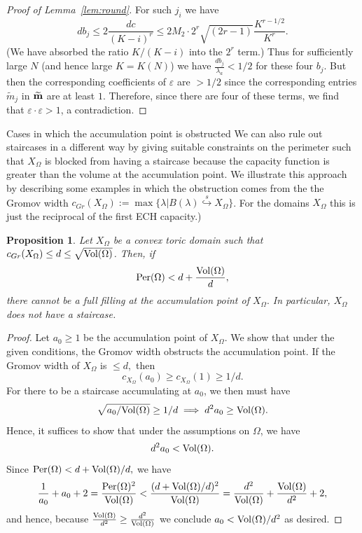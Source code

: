 \documentclass[11pt, reqno]{amsart}
\makeatletter
\def\subsection{\@startsection{subsection}{2}%
  \z@{.75\linespacing\@plus.7\linespacing}{-.5em}%
  {\normalfont\large\bfseries}}
\newtheorem{prop}[thm]{Proposition}
\theoremstyle{remark}
\numberwithin{equation}{subsection}
\numberwithin{figure}{section}
\theoremstyle{customremark}
\newcommand{\se}{{\stackrel{s}\hookrightarrow}}
\newcommand{\Vol}{{\rm Vol}}
\newcommand{\Per}{{\rm Per}}
\newcommand{\Tm}{{\widetilde m}}
\newcommand{\Om}{{\Omega}}
\newcommand{\la}{{\lambda}}
\newcommand{\eps}{\varepsilon}
\makeatother
\begin{document}
\begin{proof}[Proof of Lemma~\ref{lem:round}]
For such $j_i$ we have
$$
d b_j \le 2 \frac {dc}{ (K-i)^r}  \le 2M_2 \cdot 2^{r} \sqrt{ (2r-1) } \frac{ K^{r-1/2}}{K^r}.
$$
(We have absorbed the ratio $K/(K-i)$  into the $2^r$ term.)  Thus for sufficiently large $N$ (and hence large  $K=K(N)$) we have $\frac{d b_{j}}{\lambda_a} < 1/2$ for these four $b_j$.
But then the corresponding coefficients of $\eps$ are $> 1/2$ since the corresponding entries $\Tm_j$ in $\widetilde{\bf m}$ are at least $1$. Therefore, since there are four of these terms, we find that $\eps\cdot\eps> 1$, a contradiction.
\end{proof}






\subsection{Cases in which the accumulation point is obstructed}\label{ss:accobstr}
We can also rule out staircases in a different way by giving suitable constraints on the perimeter such that $X_\Omega$ is blocked from having a staircase because  the capacity function is greater than the volume at the accumulation point.  We  illustrate this
approach by describing some examples in which the obstruction comes from the the Gromov width $c_{Gr}(X_\Omega):= \max\{ \la | B(\la)\se X_\Om\}$. For the domains $X_\Om$ this is just
 the reciprocal of
 the first ECH capacity.) 
 
\begin{prop} \label{prop:noStairGromov}
     Let $X_\Omega$ be a convex toric domain such that $c_{Gr}(X_\Omega) \leq d \le \sqrt{\Vol(\Om)}$.
     Then, if 
     \begin{equation} 
     \label{eq:PVbound} \Per(\Omega)<d+\frac{\Vol(\Omega)}{d},
     \end{equation} 
     there cannot be a full filling at the accumulation point of $X_\Omega.$ In particular, $X_\Omega$ does not have a staircase. 
\end{prop}
\begin{proof} 
     Let $a_0 \geq 1$ be the accumulation point of $X_\Omega.$ We show that under the given conditions, the Gromov width obstructs the accumulation point.
     If the Gromov width of $X_\Omega$ is $\leq d,$ then 
     \[c_{X_\Omega}(a_0) \geq c_{X_\Omega}(1) \geq 1/d.
     \]
    For there to be a staircase accumulating at $a_0$, we then must have
    \[
     \sqrt{a_0/\Vol(\Omega)} \geq 1/d \implies
     d^2a_0 \geq \Vol(\Omega).
     \]
      Hence, it suffices to show that under the assumptions on $\Omega$, we have
     \begin{equation} \label{eq:GrVolBound} 
     d^2a_0< \Vol(\Omega). 
     \end{equation}
Since $\Per(\Omega)<d+\Vol(\Omega)/d,$ we have
     \[ \frac{1}{a_0}+a_0+2=\frac{\Per(\Omega)^2}{\Vol(\Omega)}<\frac{(d+\Vol(\Omega)/d)^2}{\Vol(\Omega)}=\frac{d^2}{\Vol(\Omega)}+\frac{\Vol(\Omega)}{d^2}+2,\]
     and hence, because $\frac{\Vol(\Omega)}{d^2}\ge \frac{d^2}{\Vol(\Omega)}$ we conclude $a_0<\Vol(\Omega)/d^2$ as desired. 
\end{proof}
\end{document}
